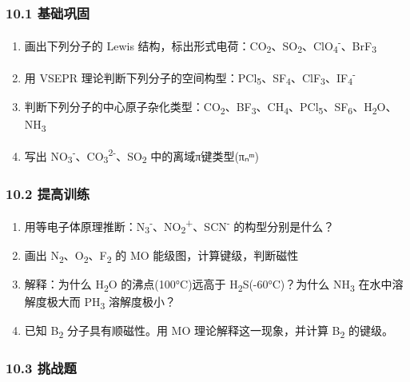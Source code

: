 \subsubsection{10.1 基础巩固}\label{ux57faux7840ux5de9ux56fa}

\begin{enumerate}
\def\labelenumi{\arabic{enumi}.}
\tightlist
\item
  画出下列分子的 Lewis 结构，标出形式电荷：CO\textsubscript{2}、SO\textsubscript{2}、ClO\textsubscript{4}\textsuperscript{-}、BrF\textsubscript{3}
\item
  用 VSEPR 理论判断下列分子的空间构型：PCl\textsubscript{5}、SF\textsubscript{4}、ClF\textsubscript{3}、IF\textsubscript{4}\textsuperscript{-}
\item
  判断下列分子的中心原子杂化类型：CO\textsubscript{2}、BF\textsubscript{3}、CH\textsubscript{4}、PCl\textsubscript{5}、SF\textsubscript{6}、H\textsubscript{2}O、NH\textsubscript{3}
\item
  写出 NO\textsubscript{3}\textsuperscript{-}、CO\textsubscript{3}\textsuperscript{2-}、SO\textsubscript{2} 中的离域π键类型(πₙᵐ)
\end{enumerate}

\subsubsection{10.2 提高训练}\label{ux63d0ux9ad8ux8badux7ec3}

\begin{enumerate}
\def\labelenumi{\arabic{enumi}.}
\setcounter{enumi}{4}
\tightlist
\item
  用等电子体原理推断：N\textsubscript{3}\textsuperscript{-}、NO\textsubscript{2}\textsuperscript{+}、SCN\textsuperscript{-} 的构型分别是什么？
\item
  画出 N\textsubscript{2}、O\textsubscript{2}、F\textsubscript{2} 的 MO 能级图，计算键级，判断磁性
\item
  解释：为什么 H\textsubscript{2}O 的沸点(100°C)远高于 H\textsubscript{2}S(-60°C)？为什么 NH\textsubscript{3} 在水中溶解度极大而 PH\textsubscript{3} 溶解度极小？
\item
  已知 B\textsubscript{2} 分子具有顺磁性。用 MO 理论解释这一现象，并计算 B\textsubscript{2} 的键级。
\end{enumerate}

\subsubsection{10.3 挑战题}\label{ux6311ux6218ux9898}

